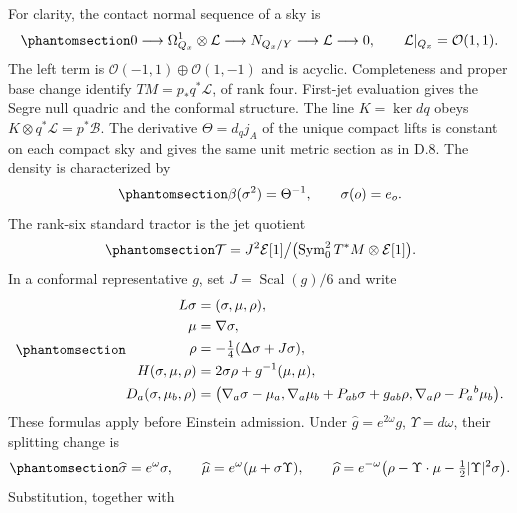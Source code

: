 \documentclass[
  english,
  11pt,
  reqno]{amsart}
\begin{document}
For clarity, the contact normal sequence of a sky is
\begin{equation}\protect\phantomsection\label{eq:gg-ward-contact-normal-sequence}{
 0\longrightarrow\Omega^1_{Q_x}\otimes\mathcal L
 \longrightarrow N_{Q_x/Y}\longrightarrow\mathcal L
 \longrightarrow0,
 \qquad
 \mathcal L|_{Q_x}=\mathcal O(1,1).
}\end{equation} The left term is
\(\mathcal O(-1,1)\oplus\mathcal O(1,-1)\) and is acyclic. Completeness
and proper base change identify \(TM=p_*q^*\mathcal L\), of rank four.
First-jet evaluation gives the Segre null quadric and the conformal
structure. The line \(K=\ker dq\) obeys
\(K\otimes q^*\mathcal L=p^*\mathcal B\). The derivative
\(\Theta=d_qj_A\) of the unique compact lifts is constant on each
compact sky and gives the same unit metric section as in D.8. The
density is characterized by
\begin{equation}\protect\phantomsection\label{eq:gg-ward-selected-root}{
 \beta(\sigma^2)=\Theta^{-1},\qquad \sigma(o)=e_o.
}\end{equation} The rank-six standard tractor is the jet quotient
\begin{equation}\protect\phantomsection\label{eq:gg-ward-tractor-jet-quotient}{
 \mathcal T=J^2\mathcal E[1]\big/
 \bigl(\operatorname{Sym}^2_0T^*M\otimes\mathcal E[1]\bigr).
}\end{equation} In a conformal representative \(g\), set
\(J=\operatorname{Scal}(g)/6\) and write
\begin{equation}\protect\phantomsection\label{eq:gg-ward-normal-tractor}{\begin{aligned}
L\sigma&=(\sigma,\mu,\rho), \\
\mu&=\nabla\sigma, \\
\rho&=-\tfrac14(\Delta\sigma+J\sigma), \\
H(\sigma,\mu,\rho)&=2\sigma\rho+g^{-1}(\mu,\mu), \\
D_a(\sigma,\mu_b,\rho)
 &=\bigl(\nabla_a\sigma-\mu_a,
 \nabla_a\mu_b+P_{ab}\sigma+g_{ab}\rho,
 \nabla_a\rho-P_a{}^b\mu_b\bigr).
\end{aligned}}\end{equation} These formulas apply before Einstein admission. Under
\(\widehat g=e^{2\omega}g\), \(\Upsilon=d\omega\), their splitting
change is
\begin{equation}\protect\phantomsection\label{eq:gg-ward-conformal-splitting}{
 \widehat\sigma=e^\omega\sigma,\qquad
 \widehat\mu=e^\omega(\mu+\sigma\Upsilon),\qquad
 \widehat\rho=e^{-\omega}
 \bigl(\rho-\Upsilon\cdot\mu-\tfrac12|\Upsilon|^2\sigma\bigr).
}\end{equation} Substitution, together with
\end{document}

